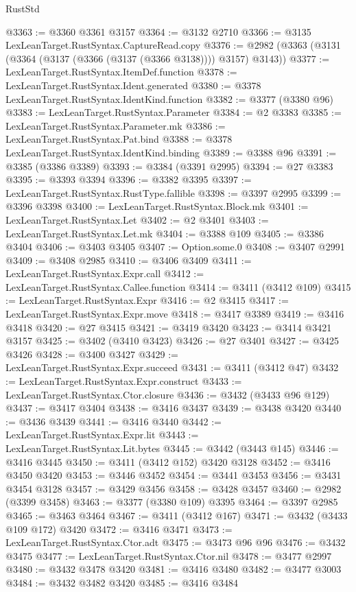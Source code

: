 \begin{lexlean}{RustStd}
\begin{coremodule}
@3363 := @3360 @3361 @3157
@3364 := @3132 @2710
@3366 := @3135 LexLeanTarget.RustSyntax.CaptureRead.copy
@3376 := @2982 (@3363 (@3131 (@3364 (@3137 (@3366 (@3137 (@3366 @3138)))) @3157) @3143))
@3377 := LexLeanTarget.RustSyntax.ItemDef.function
@3378 := LexLeanTarget.RustSyntax.Ident.generated
@3380 := @3378 LexLeanTarget.RustSyntax.IdentKind.function
@3382 := @3377 (@3380 @96)
@3383 := LexLeanTarget.RustSyntax.Parameter
@3384 := @2 @3383
@3385 := LexLeanTarget.RustSyntax.Parameter.mk
@3386 := LexLeanTarget.RustSyntax.Pat.bind
@3388 := @3378 LexLeanTarget.RustSyntax.IdentKind.binding
@3389 := @3388 @96
@3391 := @3385 (@3386 @3389)
@3393 := @3384 (@3391 @2995)
@3394 := @27 @3383
@3395 := @3393 @3394
@3396 := @3382 @3395
@3397 := LexLeanTarget.RustSyntax.RustType.fallible
@3398 := @3397 @2995
@3399 := @3396 @3398
@3400 := LexLeanTarget.RustSyntax.Block.mk
@3401 := LexLeanTarget.RustSyntax.Let
@3402 := @2 @3401
@3403 := LexLeanTarget.RustSyntax.Let.mk
@3404 := @3388 @109
@3405 := @3386 @3404
@3406 := @3403 @3405
@3407 := Option.some.{0}
@3408 := @3407 @2991
@3409 := @3408 @2985
@3410 := @3406 @3409
@3411 := LexLeanTarget.RustSyntax.Expr.call
@3412 := LexLeanTarget.RustSyntax.Callee.function
@3414 := @3411 (@3412 @109)
@3415 := LexLeanTarget.RustSyntax.Expr
@3416 := @2 @3415
@3417 := LexLeanTarget.RustSyntax.Expr.move
@3418 := @3417 @3389
@3419 := @3416 @3418
@3420 := @27 @3415
@3421 := @3419 @3420
@3423 := @3414 @3421 @3157
@3425 := @3402 (@3410 @3423)
@3426 := @27 @3401
@3427 := @3425 @3426
@3428 := @3400 @3427
@3429 := LexLeanTarget.RustSyntax.Expr.succeed
@3431 := @3411 (@3412 @47)
@3432 := LexLeanTarget.RustSyntax.Expr.construct
@3433 := LexLeanTarget.RustSyntax.Ctor.closure
@3436 := @3432 (@3433 @96 @129)
@3437 := @3417 @3404
@3438 := @3416 @3437
@3439 := @3438 @3420
@3440 := @3436 @3439
@3441 := @3416 @3440
@3442 := LexLeanTarget.RustSyntax.Expr.lit
@3443 := LexLeanTarget.RustSyntax.Lit.bytes
@3445 := @3442 (@3443 @145)
@3446 := @3416 @3445
@3450 := @3411 (@3412 @152) @3420 @3128
@3452 := @3416 @3450 @3420
@3453 := @3446 @3452
@3454 := @3441 @3453
@3456 := @3431 @3454 @3128
@3457 := @3429 @3456
@3458 := @3428 @3457
@3460 := @2982 (@3399 @3458)
@3463 := @3377 (@3380 @109) @3395
@3464 := @3397 @2985
@3465 := @3463 @3464
@3467 := @3411 (@3412 @167)
@3471 := @3432 (@3433 @109 @172) @3420
@3472 := @3416 @3471
@3473 := LexLeanTarget.RustSyntax.Ctor.adt
@3475 := @3473 @96 @96
@3476 := @3432 @3475
@3477 := LexLeanTarget.RustSyntax.Ctor.nil
@3478 := @3477 @2997
@3480 := @3432 @3478 @3420
@3481 := @3416 @3480
@3482 := @3477 @3003
@3484 := @3432 @3482 @3420
@3485 := @3416 @3484

\end{coremodule}
\end{lexlean}
